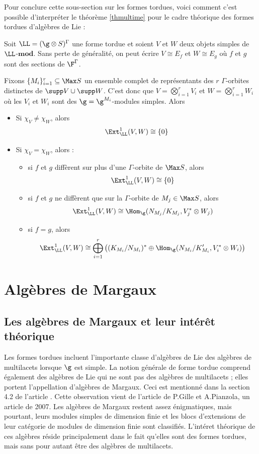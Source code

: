  
Pour conclure cette sous-section sur les formes tordues, voici comment c'est possible d'interpréter le théorème \ref{thmultime} pour le cadre théorique des formes tordues d'algèbres de Lie :

\begin{Thm} Soit $\LL = (\g \otimes S)^\Gamma$ une forme tordue et soient $V$ et $W$ deux objets simples de $\LL$-$\mathbf{mod}$. Sans perte de généralité, on peut écrire $V \cong E_f$ et $W \cong E_g$ où $f$ et $g$ sont des sections de $\F^\Gamma$.

Fixons $\{M_i\}_{i=1}^r \subseteq \Max S$ un ensemble complet de représentants des $r$ $\Gamma$-orbites distinctes de $\supp V \cup \supp W$. C'est donc que $V = \bigotimes_{i=1}^r V_i$ et  $W = \bigotimes_{i=1}^r W_i$ où les $V_i$ et $W_i$ sont des $\g = \g^{M_i}$-modules simples. Alors

\begin{itemize}
\item[\em(i)] Si $\chi_V \neq \chi_W$, alors 
$$ \Ext_\LL^1(V,W) \cong \{0\} $$
\item[\em(ii)] Si $\chi_V = \chi_W$, alors :

\begin{itemize}
\item[\em(1)] si $f$ et $g$ diff\`erent sur plus d'une $\Gamma$-orbite de $\Max S$, alors 
$$ \Ext_\LL^1(V,W) \cong \{0\} $$
\item[\em(2)] si $f$ et $g$ ne diff\`erent que sur la $\Gamma$-orbite de $M_j \in \Max S$, alors 
$$ \Ext_\LL^1(V,W) \cong \Hom_{\g}(N_{M_j}/K_{M_j},V_j^* \otimes W_j) $$
\item[\em(3)] si $f = g$, alors 
$$ \Ext_\LL^1(V,W) \cong \bigoplus_{i=1}^r \big((K_{M_i}/N_{M_i})^* \oplus \Hom_\g(N_{M_i}/K_{M_i}',V_i^* \otimes W_i)\big) $$
\end{itemize}
\end{itemize}
\end{Thm}


\section{Algèbres de Margaux}
%
\subsection{Les algèbres de Margaux et leur intérêt théorique}

Les formes tordues incluent l'importante classe d'algèbres de Lie des algèbres de multilacets lorsque $\g$ est simple. La notion générale de forme tordue comprend également des algèbres de Lie qui ne sont pas des algèbres de multilacets ; elles portent l'appellation d'algèbres de Margaux. Ceci est mentionné dans la section 4.2 de l'article \cite{LPtfa}. Cette observation vient de l'article \cite{GPmar} de P.Gille et A.Pianzola, un article de 2007. Les algèbres de Margaux restent assez énigmatiques, mais pourtant, leurs modules simples de dimension finie et les blocs d'extensions de leur catégorie de modules de dimension finie sont classifiés. L'intéret théorique de ces algèbres réside principalement dans le fait qu'elles sont des formes tordues, mais sans pour autant être des algèbres de multilacets.

